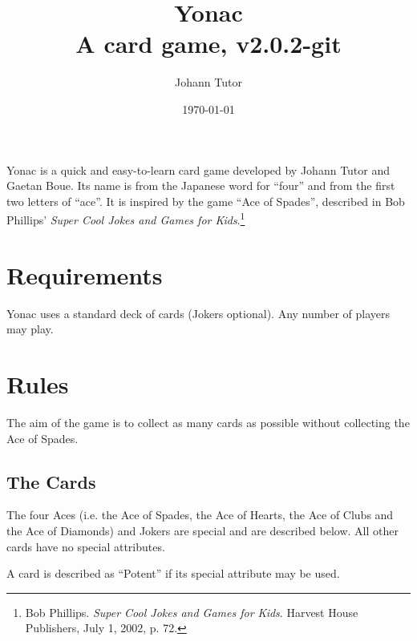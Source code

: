 \documentclass{article}
\newcommand\theversion{2.0.2-git}
\begin{document}
\title{Yonac\\ \large A card game, v\theversion}
\author{Johann Tutor}
\date{\today}
\maketitle


Yonac is a quick and easy-to-learn card game developed by Johann Tutor
and Gaetan Boue. Its name is from the Japanese word for ``four'' and
from the first two letters of ``ace''. It is inspired by the game ``Ace
of Spades'', described in Bob Phillips' \textit{Super Cool Jokes and Games for Kids}.\footnote{Bob Phillips. \textit{Super Cool Jokes and Games for Kids}. Harvest House Publishers, July 1, 2002, p. 72.}

\tableofcontents

\newpage

\section{Requirements \label{sec:requirements}}

Yonac uses a standard deck of cards (Jokers optional). Any number of
players may play.

\section{Rules \label{sec:rules}}

The aim of the game is to collect as many cards as possible without
collecting the Ace of Spades.

\subsection{The Cards \label{sec:cards}}

The four Aces (i.e. the Ace of Spades, the Ace of Hearts, the Ace of Clubs and
the Ace of Diamonds) and Jokers are special and are described below. All other
cards have no special attributes.

A card is described as ``Potent'' if its special attribute may be used.
\end{document}

